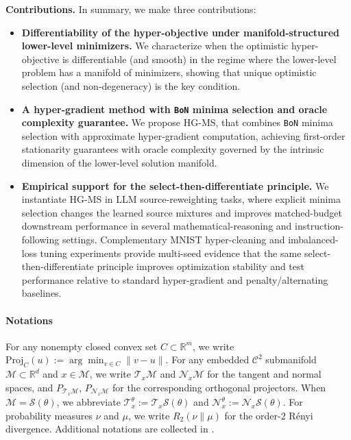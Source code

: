 \documentclass{article}
\theoremstyle{normaltheorem}
\newcommand{\R}{\mathbb{R}}
\newcommand{\calS}{\mathcal{S}}
\newcommand{\calT}{\mathcal{T}}
\newcommand{\calN}{\mathcal{N}}
\newcommand{\BoN}{\texttt{BoN}\xspace}
\begin{document}
\textbf{Contributions.} In summary, we make three contributions:
\begin{itemize}[leftmargin=*]
\item \textbf{Differentiability of the hyper-objective under manifold-structured lower-level minimizers.}
We characterize when the optimistic hyper-objective is differentiable (and smooth) in the regime where the lower-level problem has a manifold of minimizers, showing that unique optimistic selection (and non-degeneracy) is  the key condition.

\item \textbf{A hyper-gradient method with \BoN minima selection and oracle complexity guarantee.}
We propose \textsc{HG-MS}, that combines \BoN minima selection with approximate hyper-gradient computation, achieving first-order stationarity guarantees with  oracle complexity governed by the intrinsic dimension of the lower-level solution manifold. 

\item \textbf{{Empirical support for the select-then-differentiate principle.}}
We instantiate HG-MS in LLM source-reweighting tasks, where explicit minima selection changes the learned source mixtures and improves matched-budget downstream performance in several mathematical-reasoning and instruction-following settings. Complementary MNIST hyper-cleaning and imbalanced-loss tuning experiments provide multi-seed evidence that the same select-then-differentiate principle improves optimization stability and test performance relative to standard hyper-gradient and penalty/alternating baselines.
\end{itemize}
\paragraph{Notations}
For any nonempty closed convex set \(C\subset\R^m\), we write $\mathrm{Proj}_{C}(u) :=\arg\min_{v\in C}\|v-u\|$.
For any embedded \(\mathcal{C}^{2}\) submanifold \(\mathcal{M}\subset\R^{d}\) and \(x\in\mathcal{M}\), we write
\(\calT_{x}\mathcal{M}\) and \(\calN_{x}\mathcal{M}\) for the tangent and normal spaces, and
\(P_{\calT_x\mathcal{M}}\), \(P_{\calN_x\mathcal{M}}\) for the corresponding orthogonal projectors.
When \(\mathcal{M}=\calS(\theta)\), we abbreviate \(\calT_x^\theta := \calT_x\calS(\theta)\) and \(\calN_x^\theta := \calN_x\calS(\theta)\).
For probability measures \(\nu\) and \(\mu\), we write \(R_2(\nu\|\mu)\) for the order-$2$ R\'enyi divergence.
Additional notations are collected in .
\end{document}
